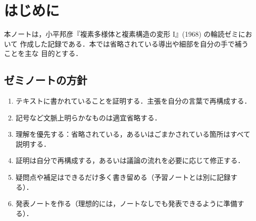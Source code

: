 \chapter*{はじめに}

本ノートは，小平邦彦『複素多様体と複素構造の変形 I』(1968) の輪読ゼミにおいて
作成した記録である．本では省略されている導出や細部を自分の手で補うことを主な
目的とする．

\section*{ゼミノートの方針}

\begin{enumerate}
  \item テキストに書かれていることを証明する．主張を自分の言葉で再構成する．
  \item 記号など文脈上明らかなものは適宜省略する．
  \item 理解を優先する：省略されている，あるいはごまかされている箇所はすべて
        説明する．
  \item 証明は自分で再構成する，あるいは議論の流れを必要に応じて修正する．
  \item 疑問点や補足はできるだけ多く書き留める（予習ノートとは別に記録する）．
  \item 発表ノートを作る（理想的には，ノートなしでも発表できるように準備する）．
\end{enumerate}
